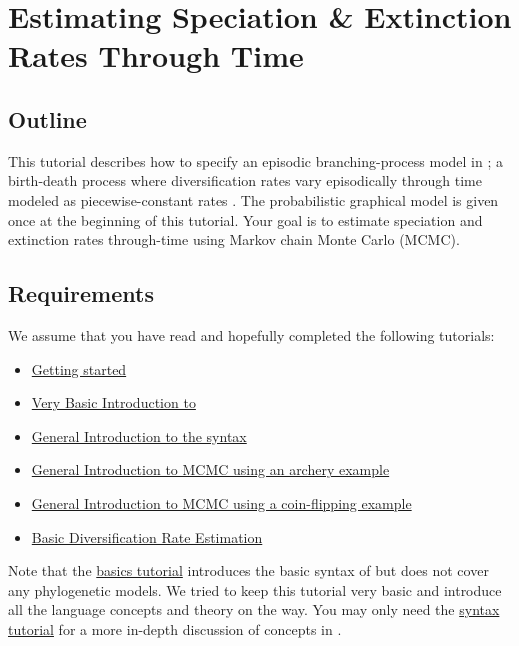 \section{Estimating Speciation \& Extinction Rates Through Time}

\subsection{Outline}

This tutorial describes how to specify an episodic branching-process model in \RevBayes; a birth-death process where diversification rates vary episodically through time modeled as piecewise-constant rates \citep{Stadler2011,Hoehna2015a}.
The probabilistic graphical model is given once at the beginning of this tutorial.
Your goal is to estimate speciation and extinction rates through-time using Markov chain Monte Carlo (MCMC).


\subsection{Requirements}
We assume that you have read and hopefully completed the following tutorials:
\begin{itemize}
\item \href{https://github.com/revbayes/revbayes_tutorial/raw/master/tutorial_TeX/RB_Getting_Started/RB_Getting_Started.pdf}{Getting started}
\item \href{https://github.com/revbayes/revbayes_tutorial/raw/master/tutorial_TeX/RB_Intro_Tutorial/RB_Intro_Tutorial.pdf}{Very Basic Introduction to \Rev}
\item \href{https://github.com/revbayes/revbayes_tutorial/raw/master/tutorial_TeX/RB_Rev_Tutorial/RB_Rev_Tutorial.pdf}{General Introduction to the \Rev syntax}
\item \href{https://github.com/revbayes/revbayes_tutorial/raw/master/tutorial_TeX/RB_MCMC_Archery_Tutorial/RB_MCMC_Archery_Tutorial.pdf}{General Introduction to MCMC using an archery example}
\item \href{https://github.com/revbayes/revbayes_tutorial/raw/master/tutorial_TeX/RB_MCMC_Binomial_Tutorial/RB_MCMC_Binomial_Tutorial.pdf}{General Introduction to MCMC using a coin-flipping example}
\item \href{https://github.com/revbayes/revbayes_tutorial/raw/master/tutorial_TeX/RB_DiversificationRate_Tutorial/RB_DiversificationRate_Tutorial.pdf}{Basic Diversification Rate Estimation}
\end{itemize}
Note that the \href{https://github.com/revbayes/revbayes_tutorial/raw/master/tutorial_TeX/RB_Intro_Tutorial/RB_Intro_Tutorial.pdf}{\Rev basics tutorial} introduces the basic syntax of \Rev but does not cover any phylogenetic models.
We tried to keep this tutorial very basic and introduce all the language concepts and theory on the way.
You may only need the \href{https://github.com/revbayes/revbayes_tutorial/raw/master/tutorial_TeX/RB_Rev_Tutorial/RB_Rev_Tutorial.pdf}{\Rev syntax tutorial} for a more in-depth discussion of concepts in \Rev.


